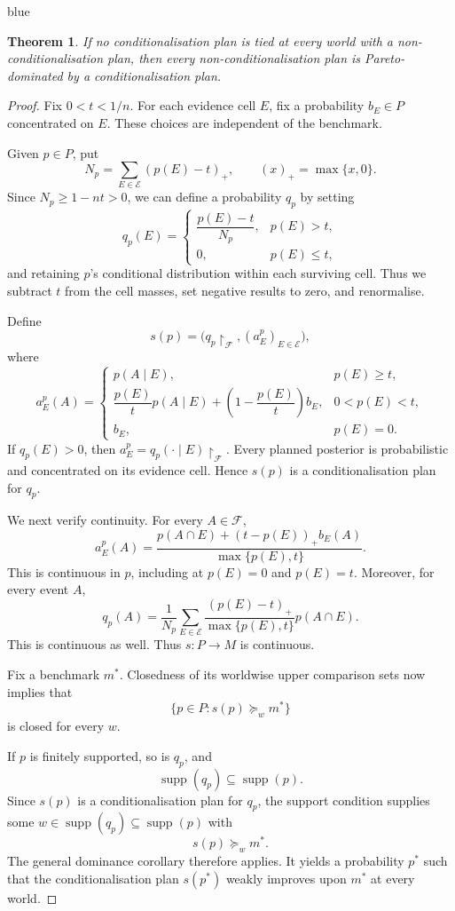 \documentclass[11pt]{article}
\newtheorem{theorem}{Theorem}[section]
\theoremstyle{definition}
\theoremstyle{remark}
\newcommand{\agenda}{\mathcal F}
\newcommand{\supp}{\operatorname{supp}}
\newenvironment{AIwritten}{\begin{color}{blue}}{\end{color}}
\begin{document}
\begin{AIwritten}
\begin{theorem}
		If no conditionalisation plan is tied at every
		world with a non-conditionalisation plan, then every
		non-conditionalisation plan is Pareto-dominated
		by a conditionalisation plan.
	\end{theorem}
	
	\begin{proof}
		Fix $0<t<1/n$. For each evidence cell $E$, fix
		a probability $b_E\in P$ concentrated on $E$.
		These choices are independent of the benchmark.
		
		Given $p\in P$, put
		\[
		N_p=\sum_{E\in\mathcal E}(p(E)-t)_+,
		\qquad (x)_+=\max\{x,0\}.
		\]
		Since $N_p\ge1-nt>0$, we can define a probability
		$q_p$ by setting
		\[
		q_p(E)=
		\begin{cases}
			\dfrac{p(E)-t}{N_p}, & p(E)>t,\\[2mm]
			0, & p(E)\le t,
		\end{cases}
		\]
		and retaining $p$'s conditional distribution within
		each surviving cell. Thus we subtract $t$ from
		the cell masses, set negative results to zero,
		and renormalise.
		
		Define
		\[
		s(p)=
		\bigl(q_p\upharpoonright_\agenda,
		(a_E^p)_{E\in\mathcal E}\bigr),
		\]
		where
		\[
		a_E^p(A)=
		\begin{cases}
			p(A\mid E),
			& p(E)\ge t,\\[2mm]
			\dfrac{p(E)}{t}
			p(A\mid E)
			+\left(1-\dfrac{p(E)}{t}\right)
			b_E,
			& 0<p(E)<t,\\[2mm]
			b_E,
			& p(E)=0.
		\end{cases}
		\]
		If $q_p(E)>0$, then
		$a_E^p=q_p(\cdot\mid E)\upharpoonright_\agenda$.
		Every planned posterior is probabilistic and
		concentrated on its evidence cell.
		Hence $s(p)$ is a conditionalisation plan for $q_p$.
		
		We next verify continuity. For every $A\in\agenda$,
		\[
		a_E^p(A)=
		\frac{p(A\cap E)+(t-p(E))_+b_E(A)}
		{\max\{p(E),t\}}.
		\]
		This is continuous in $p$, including at
		$p(E)=0$ and $p(E)=t$.
		Moreover, for every event $A$,
		\[
		q_p(A)=
		\frac{1}{N_p}
		\sum_{E\in\mathcal E}
		\frac{(p(E)-t)_+}{\max\{p(E),t\}}
		p(A\cap E).
		\]
		This is continuous as well.
		Thus $s\colon P\to M$ is continuous.
		
		Fix a benchmark $m^*$. Closedness of its worldwise
		upper comparison sets now implies that
		\[
		\{p\in P:s(p)\succeq_w m^*\}
		\]
		is closed for every $w$.
		
		If $p$ is finitely supported, so is $q_p$, and
		\[
		\supp(q_p)\subseteq\supp(p).
		\]
		Since $s(p)$ is a conditionalisation plan for $q_p$,
		the support condition supplies some
		$w\in\supp(q_p)\subseteq\supp(p)$ with
		\[
		s(p)\succeq_w m^*.
		\]
		The general dominance corollary therefore applies.
		It yields a probability $p^*$ such that the
		conditionalisation plan $s(p^*)$ weakly improves
		upon $m^*$ at every world.
		

\end{proof}
\end{AIwritten}
\end{document}
